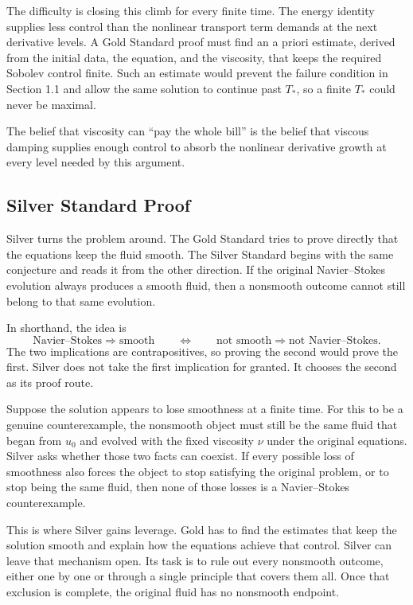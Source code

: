 The difficulty is closing this climb for every finite time.  The energy
identity supplies less control than the nonlinear transport term demands at
the next derivative levels.  A Gold Standard proof must find an a priori
estimate, derived from the initial data, the equation, and the viscosity, that
keeps the required Sobolev control finite.  Such an estimate would prevent the
failure condition in Section 1.1 and allow the same solution to continue past
\(T_*\), so a finite \(T_*\) could never be maximal.

The belief that viscosity can ``pay the whole bill'' is the belief that viscous
damping supplies enough control to absorb the nonlinear derivative growth at
every level needed by this argument.

\subsection{Silver Standard Proof}

Silver turns the problem around.  The Gold Standard tries to prove directly
that the equations keep the fluid smooth.  The Silver Standard begins with the
same conjecture and reads it from the other direction.  If the original
Navier--Stokes evolution always produces a smooth fluid, then a nonsmooth
outcome cannot still belong to that same evolution.

In shorthand, the idea is
\[
  \text{Navier--Stokes}\Longrightarrow\text{smooth}
  \qquad\Longleftrightarrow\qquad
  \text{not smooth}\Longrightarrow\text{not Navier--Stokes}.
\]
The two implications are contrapositives, so proving the second would prove the
first.  Silver does not take the first implication for granted.  It chooses the
second as its proof route.

Suppose the solution appears to lose smoothness at a finite time.  For this to
be a genuine counterexample, the nonsmooth object must still be the same fluid
that began from \(u_0\) and evolved with the fixed viscosity \(\nu\) under the
original equations.  Silver asks whether those two facts can coexist.  If every
possible loss of smoothness also forces the object to stop satisfying the
original problem, or to stop being the same fluid, then none of those losses is
a Navier--Stokes counterexample.

This is where Silver gains leverage.  Gold has to find the estimates that keep
the solution smooth and explain how the equations achieve that control.  Silver
can leave that mechanism open.  Its task is to rule out every nonsmooth outcome,
either one by one or through a single principle that covers them all.  Once that
exclusion is complete, the original fluid has no nonsmooth endpoint.

